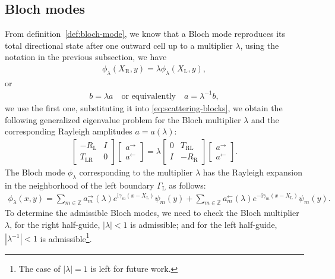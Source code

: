 \documentclass[11pt,fleqn]{article}
\newcommand{\ii}{\mathrm{i}}
\theoremstyle{definition}
\theoremstyle{remark}
\begin{document}
\subsection{Bloch modes}
From definition~\ref{def:bloch-mode}, we know that a Bloch mode reproduces its total directional state after one outward cell up to a multiplier $\lambda$, using the notation in the previous subsection, we have
\begin{align*}
  \phi_\lambda(X_\mathrm{R}, y) = \lambda \phi_\lambda(X_\mathrm{L},y),
\end{align*}
or \begin{align*}
  b = \lambda a \quad \text{or equivalently}\quad a = \lambda^{-1} b,
\end{align*}
we use the first one, substituting it into \eqref{eq:scattering-blocks}, we obtain
the following generalized eigenvalue problem for the Bloch multiplier $\lambda$ and the corresponding Rayleigh amplitudes $a = a(\lambda)$:
\begin{align}
  \begin{bmatrix}
    -R_\mathrm{L} & I \\ T_\mathrm{LR} & 0
  \end{bmatrix}\begin{bmatrix}
    a^\rightarrow \\ a^\leftarrow
  \end{bmatrix}
   = \lambda \begin{bmatrix}
    0 & T_\mathrm{RL} \\ I & -R_\mathrm{R}
  \end{bmatrix}\begin{bmatrix}
    a^\rightarrow \\ a^\leftarrow
  \end{bmatrix}.
\end{align}
The Bloch mode $\phi_\lambda$ corresponding to the multiplier $\lambda$ has the Rayleigh expansion in the neighborhood of the left boundary $\Gamma_\mathrm{L}$ as follows:
\begin{align*}
  \phi_\lambda(x,y) = \sum_{m\in\mathbb{Z}} a_m^\rightarrow(\lambda) e^{\ii \gamma_m (x - X_\mathrm{L})} \psi_m(y) + \sum_{m\in\mathbb{Z}} a_m^\leftarrow(\lambda) e^{-\ii \gamma_m (x - X_\mathrm{L})} \psi_m(y).
\end{align*}
To determine the admissible Bloch modes, we need to check the Bloch multiplier $\lambda$,
for the right half-guide, $|\lambda| < 1$ is admissible; and for the left half-guide, $|\lambda^{-1}| < 1$ is admissible\footnote{The case of $|\lambda| = 1$ is left for future work.}. 
\end{document}
